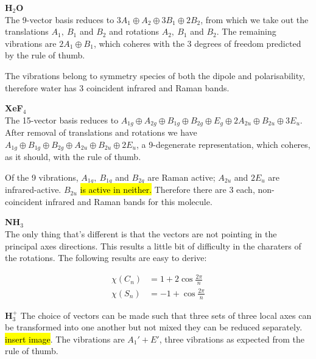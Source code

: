 \textbf{H$_2$O}\\
The 9-vector basis reduces to $3A_1\oplus A_2\oplus 3B_1\oplus 2B_2$, from which we take out the translations $A_1,\ B_1$ and $B_2$ and rotations $A_2,\ B_1$ and $B_2$. The remaining vibrations are $2A_1\oplus B_1$, which coheres with the 3 degrees of freedom predicted by the rule of thumb. \par
The vibrations belong to symmetry species of both the dipole and polarisability, therefore water has 3 coincident infrared and Raman bands.\par
\textbf{XeF$_4$}\\
The 15-vector basis reduces to $A_{1g}\oplus A_{2g}\oplus B_{1g}\oplus B_{2g}\oplus E_g\oplus 2A_{2u}\oplus B_{2u}\oplus 3E_u $. After removal of translations and rotations we have $A_{1g}\oplus B_{1g}\oplus B_{2g}\oplus A_{2u}\oplus B_{2u}\oplus 2E_u$, a 9-degenerate representation, which coheres, as it should, with the rule of thumb. \par
Of the 9 vibrations, $A_{1g},\ B_{1g}$ and $B_{2g}$ are Raman active; $A_{2u}$ and $2E_u$ are infrared-active. $B_{2u}$ \hl{is active in neither.} Therefore there are 3 each, non-coincident infrared and Raman bands for this molecule. \par
\textbf{NH$_3$}\\
The only thing that's different is that the vectors are not pointing in the principal axes directions. 
This results a little bit of difficulty in the charaters of the rotations. 
The following results are easy to derive:
\begin{prt}
\begin{equation}
\begin{aligned}
\chi(C_n)&=1+2\cos{\frac{2\pi}{n}}\\
\chi(S_n)&=-1+\cos{\frac{2\pi}{n}}
\end{aligned}
\end{equation}
\end{prt}
\textbf{H$_3^+$}
The choice of vectors can be made such that three sets of three local axes can be transformed into one another but not mixed \ie they can be reduced separately. \hl{insert image}.
The vibrations are $A_1'+E'$, three vibrations as expected from the rule of thumb. 
